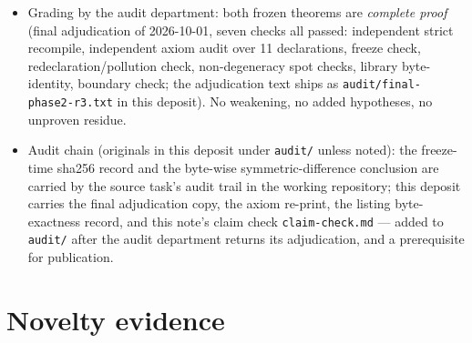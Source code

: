 \documentclass[11pt]{article}
\begin{document}
\begin{itemize}
\begin{lstlisting}[basicstyle=\ttfamily\footnotesize,frame=none]
'PrismR3.dspoke_val' depends on axioms: [propext, Classical.choice, Quot.sound]
'PrismR3.drim_val' depends on axioms: [propext, Classical.choice, Quot.sound]
'PrismR3.aspoke_strong' depends on axioms: [propext, Quot.sound]
'PrismR3.arim_strong' depends on axioms: [propext, Quot.sound]
\end{lstlisting}
Every line is a subset of the whitelist \{propext, \texttt{Quot.sound},
\texttt{Classical.choice}\}; \texttt{sorryAx} does not occur, and no
\texttt{Lean.ofReduceBool} occurs (the proof contains no
\texttt{native\_decide}; the four \texttt{native\_decide} data anchors of the
frozen statement file are verification-only anchors outside the deposited
proof, exactly as the frozen file's own header notes).
\item Grading by the audit department: both frozen theorems are
\emph{complete proof} (final adjudication of 2026-10-01, seven checks all
passed: independent strict recompile, independent axiom audit over 11
declarations, freeze check, redeclaration/pollution check, non-degeneracy
spot checks, library byte-identity, boundary check; the adjudication text
ships as \texttt{audit/final-phase2-r3.txt} in this deposit). No weakening,
no added hypotheses, no unproven residue.
\item Audit chain (originals in this deposit under \texttt{audit/} unless
noted): the freeze-time sha256 record and the byte-wise symmetric-difference
conclusion are carried by the source task's audit trail in the working
repository; this deposit carries the final adjudication copy, the axiom
re-print, the listing byte-exactness record, and this note's claim check
\texttt{claim-check.md} --- added to \texttt{audit/} after the audit
department returns its adjudication, and a prerequisite for publication.
\end{itemize}

\section{Novelty evidence}\label{sec:novelty}
\end{document}
